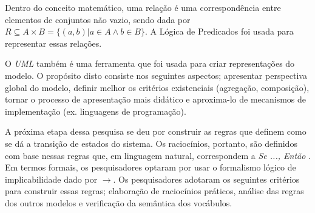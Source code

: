 Dentro do conceito matemático, uma relação é uma correspondência entre elementos de conjuntos não vazio, sendo dada por
$R \subseteq  A \times B = \{(a,b)| a \in A \wedge b \in B \}$. A Lógica de Predicados foi usada para representar essas
relações.

O \textit{UML} também é uma ferramenta que foi usada para criar representações do modelo. O propósito disto consiste nos
seguintes aspectos; apresentar perspectiva global do modelo, definir melhor os critérios existenciais (agregação, composição),
tornar o processo de apresentação mais didático e aproxima-lo de mecanismos de implementação (ex. linguagens de programação). 

A próxima etapa dessa pesquisa se deu por construir as regras que definem como se dá a transição de estados do sistema. Os raciocínios, portanto, são definidos com base nessas regras que, em linguagem natural, correspondem a \textit{Se ..., Então }. Em termos formais, os pesquisadores optaram por usar o formalismo lógico de implicabilidade dado por $\to$. Os pesquisadores adotaram os seguintes critérios para construir essas regras; elaboração de raciocínios práticos, análise das regras dos outros modelos e verificação da semântica dos vocábulos.   

